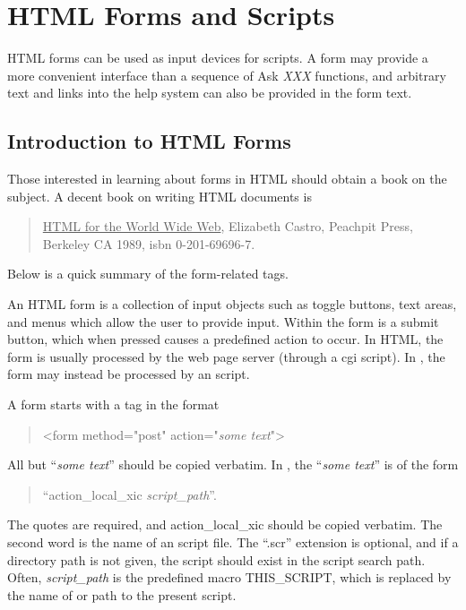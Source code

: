 \section{HTML Forms and Scripts}
\label{htmlforms}

HTML forms can be used as input devices for scripts.  A form may
provide a more convenient interface than a sequence of {\vt Ask}{\it
XXX\/} functions, and arbitrary text and links into the help system
can also be provided in the form text.

\subsection{Introduction to HTML Forms}

Those interested in learning about forms in HTML should obtain a
book on the subject.  A decent book on writing HTML documents is
\begin{quote}
\underline{HTML for the World Wide Web}, Elizabeth Castro,
Peachpit Press, Berkeley CA 1989, isbn 0-201-69696-7.
\end{quote}
Below is a quick summary of the form-related tags.

An HTML form is a collection of input objects such as toggle buttons,
text areas, and menus which allow the user to provide input.  Within
the form is a {\cb submit} button, which when pressed causes a
predefined action to occur.  In HTML, the form is usually processed by
the web page server (through a cgi script).  In {\Xic}, the form may
instead be processed by an {\Xic} script.

A form starts with a tag in the format
\begin{quote}
{\vt <form method="post" action="{\it some text\/}">}
\end{quote}

All but ``{\it some text}'' should be copied verbatim.  In {\Xic}, the
``{\it some text}'' is of the form
\begin{quote}
``{\vt action\_local\_xic} {\it script\_path}''.
\end{quote}
The quotes are required, and {\vt action\_local\_xic} should be copied
verbatim.  The second word is the name of an {\Xic} script file.  The
``{\vt .scr}'' extension is optional, and if a directory path is not
given, the script should exist in the script search path.  Often, {\it
script\_path} is the predefined macro {\vt THIS\_SCRIPT}, which is
replaced by the name of or path to the present script.

